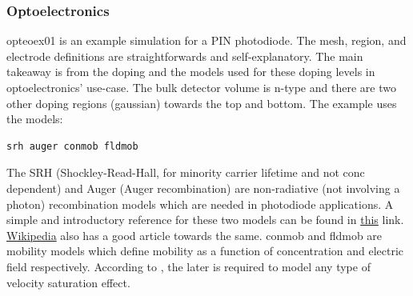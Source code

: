 \documentclass[11pt]{article}
\begin{document}
\subsubsection{Optoelectronics}
opteoex01 is an example simulation for a PIN photodiode. The mesh, region, and electrode definitions are straightforwards and self-explanatory. The main takeaway is from the doping and the models used for these doping levels in optoelectronics' use-case. 
\newline The bulk detector volume is n-type and there are two other doping regions (gaussian) towards the top and bottom. 
\newline The example uses the models: \begin{verbatim}srh auger conmob fldmob \end{verbatim}
The SRH (Shockley-Read-Hall, for minority carrier lifetime and not conc dependent) and Auger (Auger recombination) are non-radiative (not involving a photon) recombination models which are needed in photodiode applications. A simple and introductory reference for these two models can be found in \href{https://www.pveducation.org/pvcdrom/pn-junctions/types-of-recombination}{this} link. \href{ https://en.wikipedia.org/wiki/Carrier_generation_and_recombination}{Wikipedia} also has a good article towards the same. conmob and fldmob are mobility models which define mobility as a function of concentration and electric field respectively. According to \cite{silvaco-atlas}, the later is required to model any type of velocity saturation effect.


\end{document}
